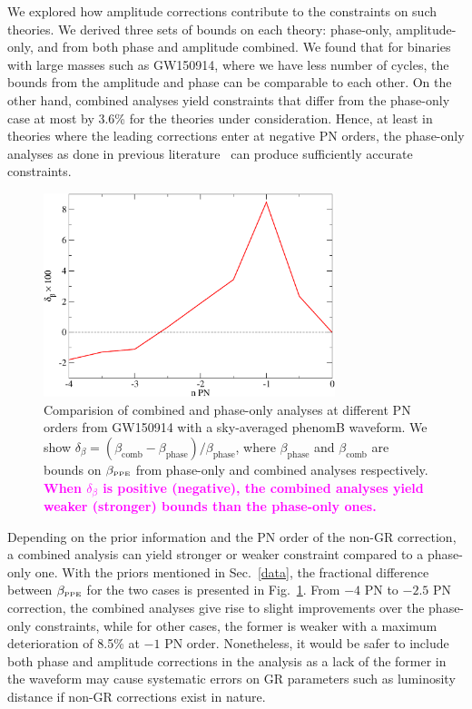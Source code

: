 \documentclass[prd,twocolumn,nofootinbib]{revtex4-1}
\newcommand{\lb}{\left(}
\newcommand{\rb}{\right)}
\newcommand{\PPE}{{\mbox{\tiny PPE}}}
\newcommand{\kent}[1]{\textcolor{magenta}{\textbf{#1}} }
\begin{document}
We explored how amplitude corrections contribute to the constraints on such theories. We derived three sets of bounds on each theory: phase-only, amplitude-only, and from both phase and amplitude combined. We found that for binaries with large masses such as GW150914, where we have less number of cycles, the bounds from the amplitude and phase can be comparable to each other. On the other hand, combined analyses yield constraints that differ from the phase-only case at most by 3.6\% for the theories under consideration. Hence, at least in theories where the leading corrections enter at negative PN orders, the phase-only analyses as done in previous literature~\cite{Yunes:2016jcc,Chamberlain:2017fjl,Nair:2019iur,Yamada:2019zrb,Carson:2019fxr} can produce sufficiently accurate constraints.
\begin{figure}[htb]
\includegraphics[width=8.5cm]{combinedvsphase.pdf}
\caption{Comparision of combined and phase-only analyses at different PN orders from GW150914 with a sky-averaged phenomB waveform. We show $\delta_{\beta}=\lb\beta_{\text{comb}}-\beta_{\text{phase}}\rb/\beta_{\text{phase}}$, where $\beta_{\text{phase}}$ and $\beta_{\text{comb}}$ are bounds on $\beta_{\PPE}$ from phase-only and combined analyses respectively. \kent{When $\delta_\beta$ is positive (negative), the combined analyses yield weaker (stronger) bounds than the phase-only ones.}}
\label{fig:combinedvsphase}
\end{figure}

Depending on the prior information and the PN order of the non-GR correction, a combined analysis can yield stronger or weaker constraint compared to a phase-only one. With the priors mentioned in Sec.~\ref{data}, the fractional difference between $\beta_{\PPE}$ for the two cases is presented in Fig.~\ref{fig:combinedvsphase}. From $-4$ PN to $-2.5$ PN correction, the combined analyses give rise to slight improvements over the phase-only constraints, while for other cases, the former is weaker with a maximum deterioration of 8.5\% at $-1$ PN order. Nonetheless, it would be safer to include both phase and amplitude corrections in the analysis as a lack of the former in the waveform may cause systematic errors on GR parameters such as luminosity distance if non-GR corrections exist in nature.
\end{document}
